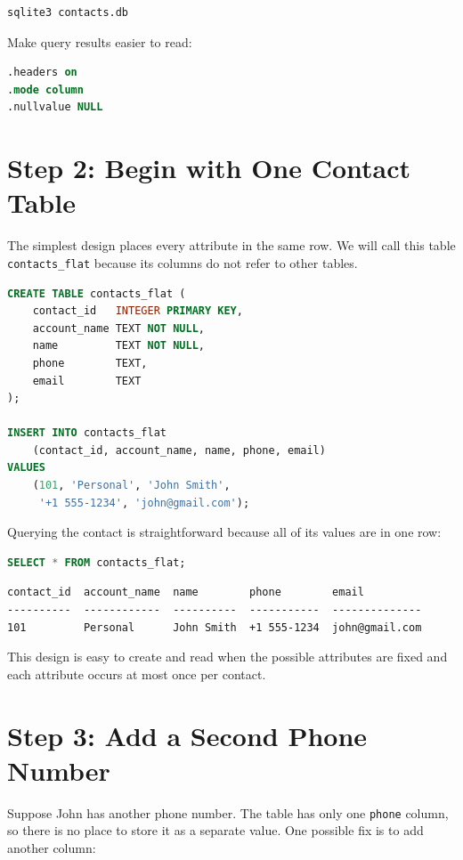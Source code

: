 \documentclass[11pt]{article}
\begin{document}
\begin{lstlisting}[language=bash]
sqlite3 contacts.db
\end{lstlisting}

Make query results easier to read:

\begin{lstlisting}[language=SQL]
.headers on
.mode column
.nullvalue NULL
\end{lstlisting}

\section*{Step 2: Begin with One Contact Table}

The simplest design places every attribute in the same row. We will call this
table \texttt{contacts\_flat} because its columns do not refer to other tables.

\begin{lstlisting}[language=SQL]
CREATE TABLE contacts_flat (
    contact_id   INTEGER PRIMARY KEY,
    account_name TEXT NOT NULL,
    name         TEXT NOT NULL,
    phone        TEXT,
    email        TEXT
);

INSERT INTO contacts_flat
    (contact_id, account_name, name, phone, email)
VALUES
    (101, 'Personal', 'John Smith',
     '+1 555-1234', 'john@gmail.com');
\end{lstlisting}

Querying the contact is straightforward because all of its values are in one
row:

\begin{lstlisting}[language=SQL]
SELECT * FROM contacts_flat;
\end{lstlisting}

\begin{verbatim}
contact_id  account_name  name        phone        email
----------  ------------  ----------  -----------  --------------
101         Personal      John Smith  +1 555-1234  john@gmail.com
\end{verbatim}

This design is easy to create and read when the possible attributes are fixed
and each attribute occurs at most once per contact.

\section*{Step 3: Add a Second Phone Number}

Suppose John has another phone number. The table has only one \texttt{phone}
column, so there is no place to store it as a separate value. One possible fix
is to add another column:
\end{document}
